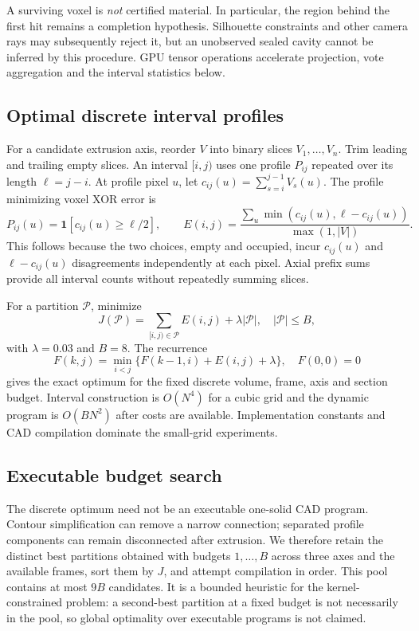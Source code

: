 \documentclass[10pt]{article}
\begin{document}
A surviving voxel is \emph{not} certified material. In particular, the region
behind the first hit remains a completion hypothesis. Silhouette constraints
and other camera rays may subsequently reject it, but an unobserved sealed
cavity cannot be inferred by this procedure. GPU tensor operations accelerate
projection, vote aggregation and the interval statistics below.

\subsection{Optimal discrete interval profiles}
For a candidate extrusion axis, reorder $V$ into binary slices
$V_1,\ldots,V_n$. Trim leading and trailing empty slices. An interval $[i,j)$
uses one profile $P_{ij}$ repeated over its length $\ell=j-i$. At profile pixel
$u$, let $c_{ij}(u)=\sum_{s=i}^{j-1}V_s(u)$. The profile minimizing voxel XOR
error is
\begin{equation}
 P_{ij}(u)=\mathbf{1}[c_{ij}(u)\geq \ell/2],\qquad
 E(i,j)=\frac{\sum_u\min(c_{ij}(u),\ell-c_{ij}(u))}{\max(1,|V|)}.
\end{equation}
This follows because the two choices, empty and occupied, incur $c_{ij}(u)$
and $\ell-c_{ij}(u)$ disagreements independently at each pixel. Axial prefix
sums provide all interval counts without repeatedly summing slices.

For a partition $\mathcal P$, minimize
\begin{equation}
 J(\mathcal P)=\sum_{[i,j)\in\mathcal P} E(i,j)+\lambda|\mathcal P|,
 \quad |\mathcal P|\leq B,
\end{equation}
with $\lambda=0.03$ and $B=8$. The recurrence
\begin{equation}
 F(k,j)=\min_{i<j}\{F(k-1,i)+E(i,j)+\lambda\},\quad F(0,0)=0
\end{equation}
gives the exact optimum for the fixed discrete volume, frame, axis and section
budget. Interval construction is $O(N^4)$ for a cubic grid and the dynamic
program is $O(BN^2)$ after costs are available. Implementation constants and
CAD compilation dominate the small-grid experiments.

\subsection{Executable budget search}
The discrete optimum need not be an executable one-solid CAD program.
Contour simplification can remove a narrow connection; separated profile
components can remain disconnected after extrusion. We therefore retain the
distinct best partitions obtained with budgets $1,\ldots,B$ across three axes
and the available frames, sort them by $J$, and attempt compilation in order.
This pool contains at most $9B$ candidates. It is a bounded heuristic for the
kernel-constrained problem: a second-best partition at a fixed budget is not
necessarily in the pool, so global optimality over executable programs is not
claimed.
\end{document}

